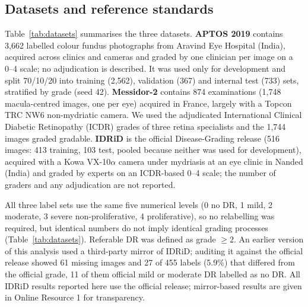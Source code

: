 \documentclass[pdflatex,sn-basic,Numbered]{sn-jnl}
\begin{document}
\subsection{Datasets and reference standards}\label{sec:data}

Table~\ref{tab:datasets} summarises the three datasets.
\textbf{APTOS 2019} \cite{aptos2019} contains 3,662 labelled colour fundus photographs from Aravind Eye Hospital (India), acquired across clinics and cameras and graded by one clinician per image on a 0--4 scale; no adjudication is described. It was used only for development and split 70/10/20 into training (2,562), validation (367) and internal test (733) sets, stratified by grade (seed 42).
\textbf{Messidor-2} \cite{decenciere2014,abramoff2013} contains 874 examinations (1,748 macula-centred images, one per eye) acquired in France, largely with a Topcon TRC NW6 non-mydriatic camera. We used the adjudicated International Clinical Diabetic Retinopathy (ICDR) grades of three retina specialists \cite{krause2018} and the 1,744 images graded gradable.
\textbf{IDRiD} \cite{porwal2018,porwal2020} is the official Disease-Grading release (516 images: 413 training, 103 test, pooled because neither was used for development), acquired with a Kowa VX-10$\alpha$ camera under mydriasis at an eye clinic in Nanded (India) and graded by experts on an ICDR-based 0--4 scale; the number of graders and any adjudication are not reported.

All three label sets use the same five numerical levels (0 no DR, 1 mild, 2 moderate, 3 severe non-proliferative, 4 proliferative), so no relabelling was required, but identical numbers do not imply identical grading processes (Table~\ref{tab:datasets}). Referable DR was defined as grade $\ge2$. An earlier version of this analysis used a third-party mirror of IDRiD; auditing it against the official release showed 61 missing images and 27 of 455 labels (5.9\%) that differed from the official grade, 11 of them official mild or moderate DR labelled as no DR. All IDRiD results reported here use the official release; mirror-based results are given in Online Resource 1 for transparency.
\end{document}
